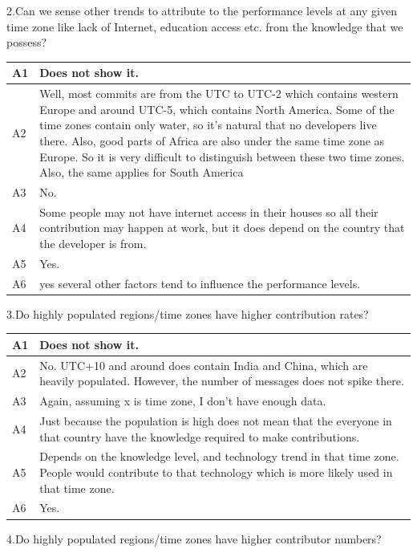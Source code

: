 \documentclass[double,12pt]{beavtex}
\begin{document}
2.Can we sense other trends to attribute to the performance levels at any given time zone like lack of Internet, education access etc. from the knowledge that we possess?	


\begin{tabular}{ |p{2cm}|p{12cm}| }
 \hline
 A1 & Does not show it.\\
 \hline
 A2 & Well, most commits are from the UTC to UTC-2 which contains western Europe and around UTC-5, which contains North America. Some of the time zones contain only water, so it's natural that no developers live there. Also, good parts of Africa are also under the same time zone as Europe. So it is very difficult to distinguish between these two time zones. Also, the same applies for South America\\ \hline
 A3 & No.\\ \hline
 A4 & Some people may not have internet access in their houses so all their contribution may happen at work, but it does depend on the country that the developer is from.\\ \hline
 A5 & Yes.\\ \hline
 A6 & yes several other factors tend to influence the performance levels.\\
 \hline
\end{tabular}


3.Do highly populated regions/time zones have higher contribution rates?	


\begin{tabular}{ |p{2cm}|p{12cm}| }
 \hline
 A1 & Does not show it.\\ \hline
 A2 & No. UTC+10 and around does contain India and China, which are heavily populated. However, the number of messages does not spike there.\\ \hline
 A3 & Again, assuming x is time zone, I don't have enough data.\\ \hline
 A4 & Just because the population is high does not mean that the everyone in that country have the knowledge required to make contributions.\\ \hline
 A5 & Depends on the knowledge level, and technology trend in that time zone. People would contribute to that technology which is more likely used in that time zone.\\ \hline
 A6 & Yes.\\
 \hline
\end{tabular}


4.Do highly populated regions/time zones have higher contributor numbers?
\end{document}
